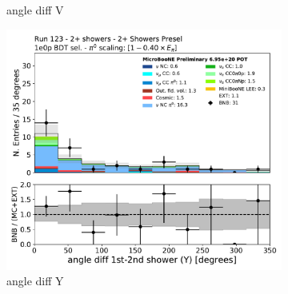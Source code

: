 \begin{figure}[H]
\begin{subfigure}{0.3\textwidth}
    \caption{angle diff V}
    \end{subfigure}
    \begin{subfigure}{0.3\textwidth}
    \includegraphics[width=1.0\textwidth]{Sidebands/Figures/TwoShr_1e0pSel/BDT/anglediff_Y.pdf}
    \caption{angle diff Y}
    \end{subfigure}
    \caption{} 
    \label{fig:HE_1eNp_1}
\end{figure}

